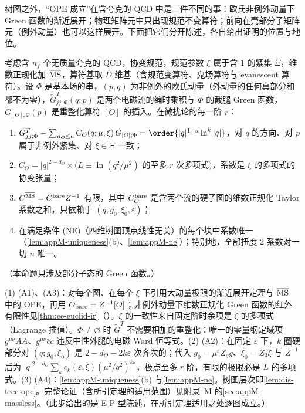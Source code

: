 树图之外，“OPE 成立”在含夸克的 QCD 中是三件不同的事：欧氏非例外动量下 Green 函数的渐近展开；物理矩阵元中只出现规范不变算符；前向在壳部分子矩阵元（例外动量）也可以这样展开。下面把它们分开陈述，各自给出证明的位置与地位。

\begin{proposition}\label{prop:dis-ope-euclid}
考虑含 $n_f$ 个无质量夸克的 QCD，协变规范，规范参数 $\xi$ 属于含 $1$ 的紧集 $\Xi$，维数正规化加 $\overline{\rm MS}$，算符基取 $D$ 维基（含规范变算符、鬼场算符与 evanescent 算符）。设 $\Phi$ 是基本场的串，$(p,q)$ 为非例外的欧氏动量（外动量的任何真部分和都不为零），$\tilde G^T_{jj;\Phi}(q;p)$ 是两个电磁流的编时乘积与 $\Phi$ 的截腿 Green 函数，$\tilde G_{[O];\Phi}(p)$ 是重整化算符 $[O]$ 的插入。在微扰论的每一阶 $r$：
\begin{enumerate}[label=(A\arabic*),leftmargin=2.6em,itemsep=0pt,topsep=2pt]
\item $\tilde G^T_{jj;\Phi}-\sum_{d_O\le a}C_O(q;\mu,\xi)\,\tilde G_{[O];\Phi}=\order{|q|^{1-a}\ln^k|q|}$，对 $q$ 的方向、对 $p$ 属于非例外紧集、对 $\xi\in\Xi$ 一致；
\item $C_O=|q|^{2-d_O}\times\big(L\equiv\ln(q^2/\mu^2)$ 的至多 $r$ 次多项式$\big)$，系数是 $\xi$ 的多项式的协变张量；
\item $C^{\overline{\rm MS}}=C^{\rm bare}Z^{-1}$ 有限，其中 $C^{\rm bare}_O$ 是含两个流的硬子图的维数正规化 Taylor 系数之和，只依赖于 $(q,g_0,\xi_0,\varepsilon)$；
\item 在满足条件 (NE)（四维树图顶点线性无关）的每个块中系数唯一（\cref{lem:appM-uniqueness}(b)、\cref{lem:appM-ne}）；特别地，全部扭度 2 系数对一切 $n$ 唯一。
\end{enumerate}
（本命题只涉及部分子态的 Green 函数。）
\end{proposition}

\begin{proofsketch}
(1) (A1)、(A3)：对每个图、在每个 $\xi$ 下引用大动量极限的渐近展开定理\cite{Smirnov:1990rz,Smirnov2002}与 $\overline{\rm MS}$ 中的 OPE\cite{Chetyrkin:1982zq}，再用 $O_{\rm bare}=Z^{-1}[O]$；非例外动量下维数正规化 Green 函数的红外有限性见\cref{thm:ee-euclid-ir}（\cite[定理~1]{Breitenlohner:1976te}）。$\xi$ 的一致性来自固定阶时余项是 $\xi$ 的多项式（Lagrange 插值）。$\Phi\ne\varnothing$ 时 $\tilde G^T$ 不需要相加的重整化：唯一的零量纲定域项 $g^{\mu\nu}AA$、$g^{\mu\nu}\bar cc$ 违反中性外腿的电磁 Ward 恒等式。(2) (A2)：在固定 $\varepsilon$ 下，$k$ 圈硬部分对 $(q;g_0,\xi_0)$ 是 $2-d_O-2k\varepsilon$ 次齐次的；代入 $g_0=\mu^\varepsilon Z_gg$、$\xi_0=Z_3\xi$ 与 $Z^{-1}$ 后为 $|q|^{2-d_O}\sum_kc_k(\varepsilon,\xi)(\mu^2/q^2)^{k\varepsilon}$，极点至多 $r$ 阶，有限的极限必是 $L$ 的多项式。(3) (A4)：\cref{lem:appM-uniqueness}(b) 与\cref{lem:appM-ne}。树图层次即\cref{lem:dis-tree-ope}。完整论证（含所引定理的适用范围）见附录~M 的\cref{sec:appM-massless}。（此步给出的是 E-P 型陈述，在所引定理适用之处逐图成立。）
\end{proofsketch}

